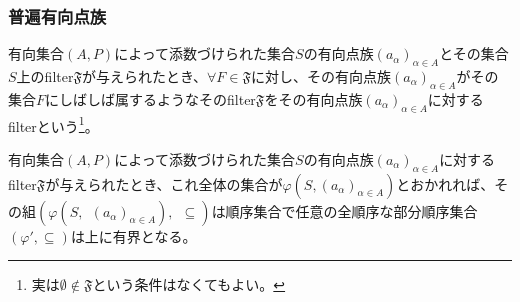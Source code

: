 \documentclass[dvipdfmx]{jsarticle}
\begin{document}
\subsubsection{普遍有向点族}%
\begin{dfn}
有向集合$(A,P)$によって添数づけられた集合$S$の有向点族$\left( a_{\alpha} \right)_{\alpha \in A}$とその集合$S$上のfilter$\mathfrak{F}$が与えられたとき、$\forall F\in \mathfrak{F}$に対し、その有向点族$\left( a_{\alpha} \right)_{\alpha \in A}$がその集合$F$にしばしば属するようなそのfilter$\mathfrak{F}$をその有向点族$\left( a_{\alpha} \right)_{\alpha \in A}$に対するfilterという\footnote{実は$\mathfrak{\emptyset \notin F}$という条件はなくてもよい。}。
\end{dfn}
\begin{thm}\label{8.1.9.2}
有向集合$(A,P)$によって添数づけられた集合$S$の有向点族$\left( a_{\alpha} \right)_{\alpha \in A}$に対するfilter$\mathfrak{F}$が与えられたとき、これ全体の集合が$\varphi\left( S,\left( a_{\alpha} \right)_{\alpha \in A} \right)$とおかれれば、その組$\left( \varphi\left( S,\ \ \left( a_{\alpha} \right)_{\alpha \in A} \right),\ \  \subseteq \right)$は順序集合で任意の全順序な部分順序集合$\left( \varphi', \subseteq \right)$は上に有界となる。
\end{thm}
\end{document}
